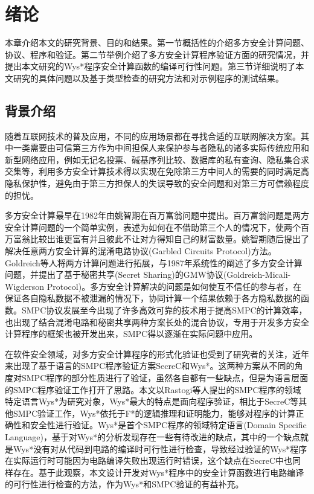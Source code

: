 \chapter{绪论}\label{chap:introduction}
本章介绍本文的研究背景、目的和结果。第一节概括性的介绍多方安全计算问题、协议、程序和验证。第二节举例介绍了多方安全计算程序验证方面的研究情况，并提出本文研究的Wys*程序安全计算函数的编译可行性问题。第三节详细说明了本文研究的具体问题以及基于类型检查的研究方法和对示例程序的测试结果。
\section{背景介绍}
随着互联网技术的普及应用，不同的应用场景都在寻找合适的互联网解决方案。其中一类需要由可信第三方作为中间担保人来保护参与者隐私的诸多实际传统应用和新型网络应用，例如无记名投票、碱基序列比较、数据库的私有查询、隐私集合求交集等，利用多方安全计算技术得以实现在免除第三方中间人的需要的同时满足高隐私保护性，避免由于第三方担保人的失误导致的安全问题和对第三方可信赖程度的担忧。

多方安全计算最早在1982年由姚智期在百万富翁问题中提出。百万富翁问题是两方安全计算问题的一个简单实例，表述为如何在不借助第三个人的情况下，使两个百万富翁比较出谁更富有并且彼此不让对方得知自己的财富数量。姚智期随后提出了解决任意两方安全计算的混淆电路协议(Garbled Circuits Protocol)方法\citep{yao1982protocols}。Goldreich等人将两方计算问题进行拓展，与1987年系统性的阐述了多方安全计算问题，并提出了基于秘密共享(Secret Sharing)的GMW协议\citep{goldreich2019play}(Goldreich-Micali-Wigderson Protocol)。多方安全计算解决的问题是如何使互不信任的参与者，在保证各自隐私数据不被泄漏的情况下，协同计算一个结果依赖于各方隐私数据的函数。SMPC协议发展至今出现了许多高效可靠的技术用于提高SMPC的计算效率，也出现了结合混淆电路和秘密共享两种方案长处的混合协议，专用于开发多方安全计算程序的框架也被开发出来，SMPC得以逐渐在实际问题中应用。

在软件安全领域，对多方安全计算程序的形式化验证也受到了研究者的关注，近年来出现了基于语言的SMPC程序验证方案SecreC\citep{almeida2018enforcing}和Wys*\citep{rastogi2019textsc}。这两种方案从不同的角度对SMPC程序的部分性质进行了验证，虽然各自都有一些缺点，但是为语言层面的SMPC程序验证工作打开了思路。本文以Rastogi等人提出的SMPC程序的领域特定语言Wys*\citep{rastogi2019textsc}为研究对象，Wys*最大的特点是面向程序验证，相比于SecreC\citep{almeida2018enforcing}等其他SMPC验证工作，Wys*依托于F*的逻辑推理和证明能力，能够对程序的计算正确性和安全性进行验证。Wys*是首个SMPC程序的领域特定语言(Domain Specific Language)，基于对Wys*的分析发现存在一些有待改进的缺点，其中的一个缺点就是Wys*没有对从代码到电路的编译时可行性进行检查，导致经过验证的Wys*程序在实际运行时可能因为电路编译失败出现运行时错误，这个缺点在SecreC中也同样存在。基于此观察，本文设计开发对Wys*程序中的安全计算函数进行电路编译的可行性进行检查的方法，作为Wys*和SMPC验证的有益补充。
